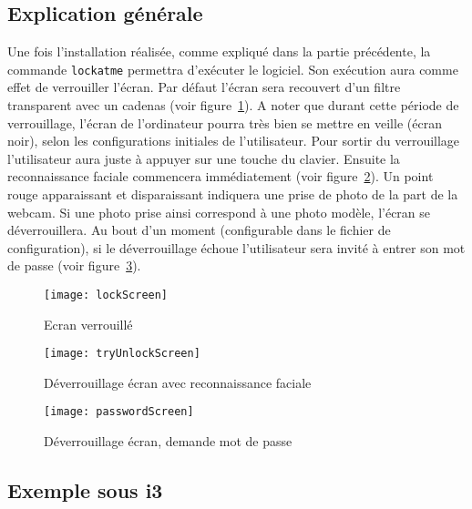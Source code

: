   \subsection{Explication générale}
Une fois l'installation réalisée, comme expliqué dans la partie précédente,
la commande \verb|lockatme| permettra d'exécuter le logiciel. Son
exécution aura comme effet de verrouiller l'écran. Par défaut l'écran sera
recouvert d'un filtre transparent avec un cadenas (voir figure~\ref{fig:lockScreen}). A noter que
durant cette période de verrouillage, l'écran de l'ordinateur pourra très bien
se mettre en veille (écran noir), selon les configurations initiales de
l'utilisateur.
Pour sortir du verrouillage l'utilisateur aura juste à appuyer sur une touche
du clavier. Ensuite la reconnaissance faciale commencera immédiatement (voir
figure~\ref{fig:tryUnlockScreen}).
Un point rouge apparaissant et disparaissant indiquera une prise de
photo de la part de la webcam. Si une photo prise ainsi correspond à une photo
modèle, l'écran se déverrouillera. Au bout d'un moment (configurable dans le
fichier de configuration), si le déverrouillage échoue l'utilisateur sera invité à
entrer son mot de passe (voir figure~\ref{fig:passwordScreen}).
\newpage
\begin{figure}[h]
  \begin{center}
  \texttt{[image: lockScreen]}
  \caption{Ecran verrouillé}
  \label{fig:lockScreen}
\end{center}
\end{figure}

\begin{figure}[h]
  \begin{center}
  \texttt{[image: tryUnlockScreen]}
  \caption{Déverrouillage écran avec reconnaissance faciale}
  \label{fig:tryUnlockScreen}
\end{center}
\end{figure}
\newpage

\begin{figure}[h]
  \begin{center}
  \texttt{[image: passwordScreen]}
  \caption{Déverrouillage écran, demande mot de passe}
  \label{fig:passwordScreen}
\end{center}
\end{figure}

  \subsection{Exemple sous i3}
